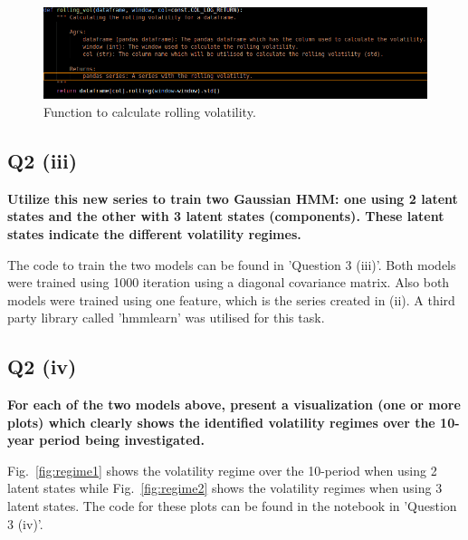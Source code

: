 \begin{figure}[H]
\centering
  \includegraphics[scale = .58]{imgs/rolling_vol.png}
  \caption{Function to calculate rolling volatility.}
  \label{fig:rollvol}
\end{figure}


\subsection{Q2 (iii)}\label{sssec:pt2q3iii}
\textbf{Utilize this new series to train two Gaussian HMM: one using 2 latent states and the other with 3 latent states (components).  These latent states indicate the different volatility regimes.}

\noindent
The code to train the two models can be found in 'Question 3 (iii)'. Both models were trained using 1000 iteration using a diagonal covariance matrix. Also both models were trained using one feature, which is the series created in (ii). A third party library called 'hmmlearn' \cite{python:hmmlearn} was utilised for this task. 



\subsection{Q2 (iv)}\label{sssec:pt2q3iv}
\textbf{For each of the two models above, present a visualization (one or more plots) which clearly shows the identified volatility regimes over the 10-year period being investigated.}

\noindent
Fig.~\ref{fig:regime1} shows the volatility regime over the 10-period when using 2 latent states while Fig.~\ref{fig:regime2} shows the volatility regimes when using 3 latent states. The code for these plots can be found in the notebook in 'Question 3 (iv)'.

